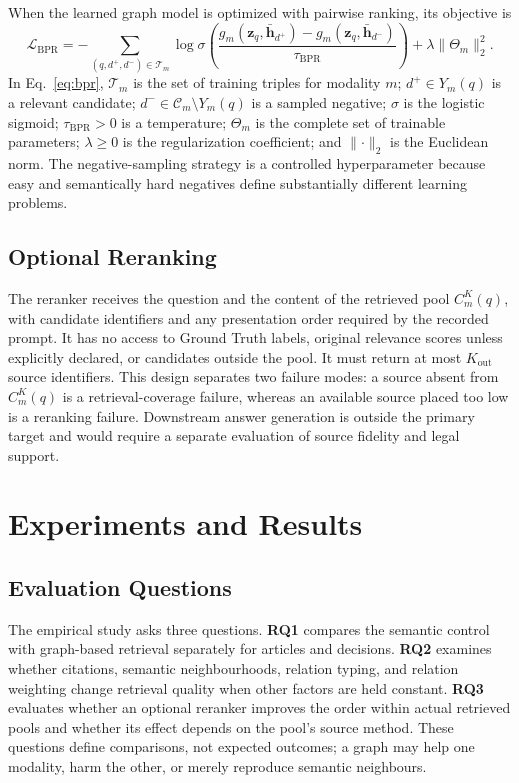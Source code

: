 \documentclass[runningheads]{llncs}
\begin{document}
When the learned graph model is optimized with pairwise ranking, its objective is
\begin{equation}
  \mathcal{L}_{\mathrm{BPR}}=
  -\!\sum_{(q,d^+,d^-)\in\mathcal{T}_m}
  \log\sigma\!\left(
  \frac{g_m(\mathbf{z}_q,\bar{\mathbf{h}}_{d^+})-
        g_m(\mathbf{z}_q,\bar{\mathbf{h}}_{d^-})}
       {\tau_{\mathrm{BPR}}}\right)
  +\lambda\lVert\Theta_m\rVert_2^2.
  \label{eq:bpr}
\end{equation}
In Eq.~\eqref{eq:bpr}, \(\mathcal{T}_m\) is the set of training triples for modality \(m\); \(d^+\in Y_m(q)\) is a relevant candidate; \(d^-\in\mathcal{C}_m\setminus Y_m(q)\) is a sampled negative; \(\sigma\) is the logistic sigmoid; \(\tau_{\mathrm{BPR}}>0\) is a temperature; \(\Theta_m\) is the complete set of trainable parameters; \(\lambda\geq0\) is the regularization coefficient; and \(\lVert\cdot\rVert_2\) is the Euclidean norm. The negative-sampling strategy is a controlled hyperparameter because easy and semantically hard negatives define substantially different learning problems.

\subsection{Optional Reranking}

The reranker receives the question and the content of the retrieved pool \(C_m^K(q)\), with candidate identifiers and any presentation order required by the recorded prompt. It has no access to Ground Truth labels, original relevance scores unless explicitly declared, or candidates outside the pool. It must return at most \(K_{\mathrm{out}}\) source identifiers. This design separates two failure modes: a source absent from \(C_m^K(q)\) is a retrieval-coverage failure, whereas an available source placed too low is a reranking failure. Downstream answer generation is outside the primary target and would require a separate evaluation of source fidelity and legal support.

\section{Experiments and Results}

\subsection{Evaluation Questions}

The empirical study asks three questions. \textbf{RQ1} compares the semantic control with graph-based retrieval separately for articles and decisions. \textbf{RQ2} examines whether citations, semantic neighbourhoods, relation typing, and relation weighting change retrieval quality when other factors are held constant. \textbf{RQ3} evaluates whether an optional reranker improves the order within actual retrieved pools and whether its effect depends on the pool's source method. These questions define comparisons, not expected outcomes; a graph may help one modality, harm the other, or merely reproduce semantic neighbours.
\end{document}
